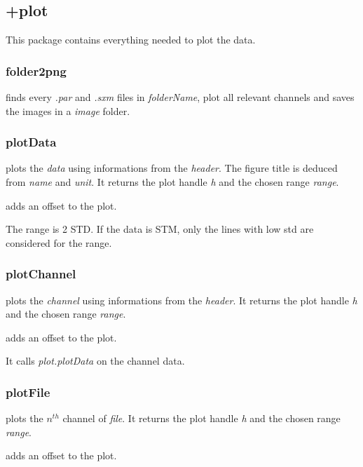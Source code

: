 \subsection{+plot}
This package contains everything needed to plot the data.

\subsubsection{folder2png}
\bdf
{} finds every \emph{.par} and \emph{.sxm} files in \emph{folderName}, plot all relevant channels and saves the images in a \emph{image} folder.
\edf

\subsubsection{plotData}
\bdf
{} plots the \emph{data} using informations from the \emph{header}. The figure title is deduced from \emph{name} and \emph{unit}. It returns the plot handle \emph{h} and the chosen range \emph{range}.
 
 adds an offset to the plot.
\edf

The range is 2 STD. If the data is STM, only the lines with low std are considered for the range.

\subsubsection{plotChannel}
\bdf
{} plots the \emph{channel} using informations from the \emph{header}. It returns the plot handle \emph{h} and the chosen range \emph{range}.

 adds an offset to the plot.
\edf

It calls \emph{plot.plotData} on the channel data.

\subsubsection{plotFile}


\bdf
{} plots the $n^{th}$ channel of \emph{file}. It returns the plot handle \emph{h} and the chosen range \emph{range}.

 adds an offset to the plot.
\edf

